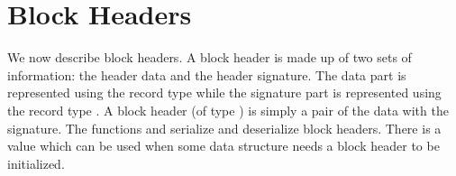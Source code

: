 \section{Block Headers}

We now describe block headers.
A block header is made up of two sets of information:
the header data and the header signature.
The data part is represented using the
record type 
{}
while the signature part is represented using the record type
{}.
A block header (of type {})
is simply a pair of the data with the signature.
The functions
{} and
{} serialize and deserialize block headers.
There is a value
{}
which can be used when some data structure needs a block header to be initialized.

